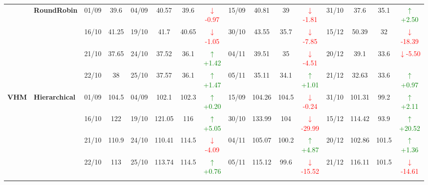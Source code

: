 {\begin{longtable}{llcc|cccc|cccc|cccc}
& \textbf{RoundRobin}
& 01/09 & 39.6 & 04/09 & 40.57 & 39.6 & \textcolor{red}{\(\downarrow\)-0.97} & 15/09 & 40.81 & 39 & \textcolor{red}{\(\downarrow\)-1.81} & 31/10 & 37.6 & 35.1 & \textcolor{green}{\(\uparrow\)+2.50} \\

&
& 16/10 & 41.25 & 19/10 & 41.7 & 40.65 & \textcolor{red}{\(\downarrow\)-1.05} & 30/10 & 43.55 & 35.7 & \textcolor{red}{\(\downarrow\)-7.85} & 15/12 & 50.39 & 32 & \textcolor{red}{\(\downarrow\)-18.39} \\

&
& 21/10 & 37.65 & 24/10 & 37.52 & 36.1 & \textcolor{green}{\(\uparrow\)+1.42} & 04/11 & 39.51 & 35 & \textcolor{red}{\(\downarrow\)-4.51} & 20/12 & 39.1 & 33.6 & \textcolor{red}{\(\downarrow\)-5.50} \\

&
& 22/10 & 38 & 25/10 & 37.57 & 36.1 & \textcolor{green}{\(\uparrow\)+1.47} & 05/11 & 35.11 & 34.1 & \textcolor{green}{\(\uparrow\)+1.01} & 21/12 & 32.63 & 33.6 & \textcolor{green}{\(\uparrow\)+0.97} \\
\midrule




\multirow{12}{*}{\textbf{VHM}} 
& \textbf{Hierarchical}
& 01/09 & 104.5 & 04/09 & 102.1 & 102.3 & \textcolor{green}{\(\uparrow\)+0.20} & 15/09 & 104.26 & 104.5 & \textcolor{red}{\(\downarrow\)-0.24} & 31/10 & 101.31 & 99.2 & \textcolor{green}{\(\uparrow\)+2.11} \\

&
& 16/10 & 122 & 19/10 & 121.05 & 116 & \textcolor{green}{\(\uparrow\)+5.05} & 30/10 & 133.99 & 104 & \textcolor{red}{\(\downarrow\)-29.99} & 15/12 & 114.42 & 93.9 & \textcolor{green}{\(\uparrow\)+20.52} \\

&
& 21/10 & 110.9 & 24/10 & 110.41 & 114.5 & \textcolor{red}{\(\downarrow\)-4.09} & 04/11 & 105.07 & 100.2 & \textcolor{green}{\(\uparrow\)+4.87} & 20/12 & 102.86 & 101.5 & \textcolor{green}{\(\uparrow\)+1.36} \\

&
& 22/10 & 113 & 25/10 & 113.74 & 114.5 & \textcolor{green}{\(\uparrow\)+0.76} & 05/11 & 115.12 & 99.6 & \textcolor{red}{\(\downarrow\)-15.52} & 21/12 & 116.11 & 101.5 & \textcolor{red}{\(\downarrow\)-14.61} \\
\cmidrule(lr){2-16}



\end{longtable}}
